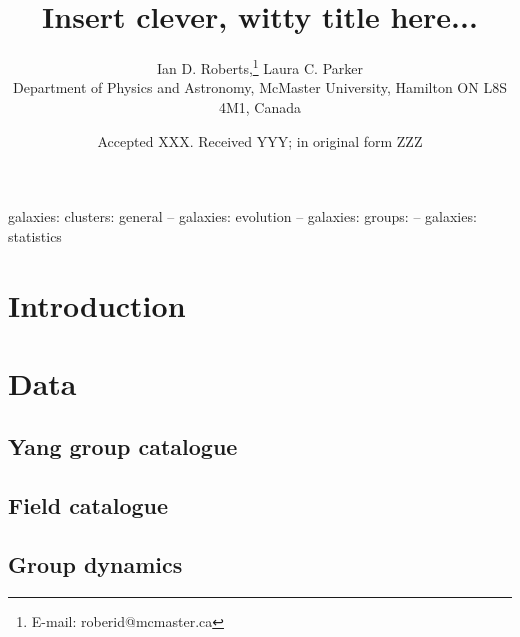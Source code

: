 \documentclass[a4paper,fleqn,usenatbib]{mnras}
\title[]{Insert clever, witty title here...}
\author[I.D. Roberts \& L.C. Parker]{
Ian D. Roberts,\thanks{E-mail: roberid@mcmaster.ca}
Laura C. Parker
\\
Department of Physics and Astronomy, McMaster University, Hamilton ON
L8S 4M1, Canada
}
\date{Accepted XXX. Received YYY; in original form ZZZ}
\begin{document}
\label{firstpage}
\pagerange{\pageref{firstpage}--\pageref{lastpage}}
\maketitle

\begin{abstract}
\end{abstract}

\begin{keywords}
galaxies: clusters: general -- galaxies: evolution -- galaxies:
groups: -- galaxies: statistics
\end{keywords}



\section{Introduction}
\label{sec:introduction}


\section{Data}
\label{sec:data}

\subsection{Yang group catalogue}

\subsection{Field catalogue}

\subsection{Group dynamics}
\end{document}
